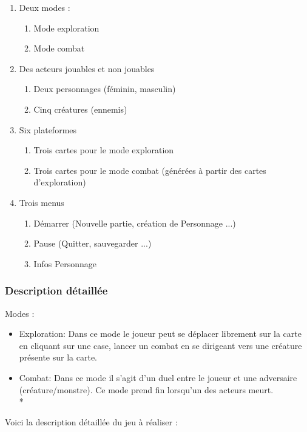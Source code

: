 \documentclass[11pt, a4paper]{article}
\begin{document}
\begin{enumerate}
\item Deux modes : 
	\begin{enumerate}
		\item Mode exploration
		\item Mode combat
	\end{enumerate}
\item Des acteurs jouables et non jouables
	\begin{enumerate}
		\item Deux personnages (féminin, masculin)
		\item Cinq créatures (ennemis)
	\end{enumerate}
\item Six plateformes
	\begin{enumerate}
		\item Trois cartes pour le mode exploration
		\item Trois cartes pour le mode combat (générées à partir des cartes d'exploration)
	\end{enumerate}
\item Trois menus
	\begin{enumerate}
		\item Démarrer (Nouvelle partie, création de Personnage ...)
		\item Pause (Quitter, sauvegarder ...)
		\item Infos Personnage
	\end{enumerate}
\end{enumerate}

\subsubsection{Description détaillée}
Modes : 
\begin{itemize}
\item Exploration: Dans ce mode le joueur peut se déplacer librement sur la carte en cliquant sur une case, lancer un combat en se dirigeant vers une créature présente sur la carte.
\item Combat: Dans ce mode il s’agit d’un duel entre le joueur et une adversaire (créature/monstre). Ce mode prend fin lorsqu’un des acteurs  meurt.\\*
\end{itemize}


Voici la description détaillée du jeu à réaliser :
\end{document}
